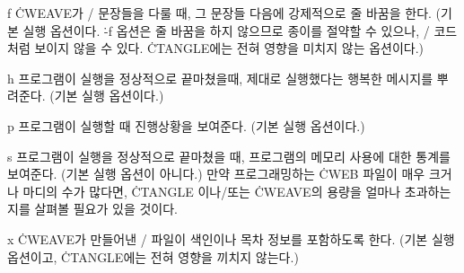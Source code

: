 \option f \.{CWEAVE}가 \CEE/ 문장들을 다룰 때, 그 문장들 다음에
강제적으로 줄 바꿈을 한다. (기본 실행 옵션이다. \.{-f} 옵션은 줄 바꿈을
하지 않으므로 종이를 절약할 수 있으나, \CEE/ 코드처럼 보이지 않을 수
있다. \.{CTANGLE}에는 전혀 영향을 미치지 않는 옵션이다.)

\option h 프로그램이 실행을 정상적으로 끝마쳤을때, 제대로 실행했다는
행복한 메시지를 뿌려준다. (기본 실행 옵션이다.)

\option p 프로그램이 실행할 때 진행상황을 보여준다. (기본 실행 옵션이다.)

\option s 프로그램이 실행을 정상적으로 끝마쳤을 때, 프로그램의 메모리 사용에 대한
통계를 보여준다. (기본 실행 옵션이 아니다.) 만약 프로그래밍하는
\.{CWEB} 파일이 매우 크거나 마디의 수가 많다면, \.{CTANGLE} 이나/또는
\.{CWEAVE}의 용량을 얼마나 초과하는지를 살펴볼 필요가 있을 것이다.

\option x \.{CWEAVE}가 만들어낸 \TEX/ 파일이 색인이나 목차 정보를
포함하도록 한다. (기본 실행 옵션이고, \.{CTANGLE}에는 전혀 영향을
끼치지 않는다.)

